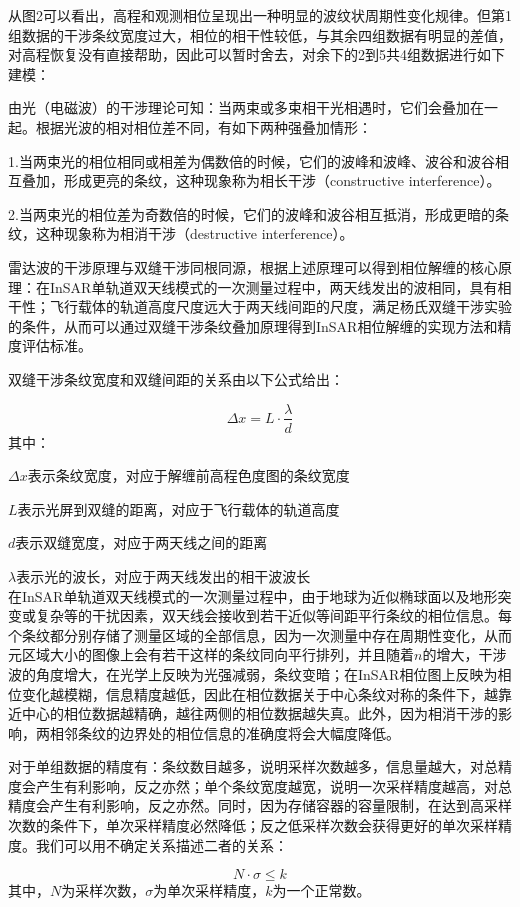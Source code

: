 \documentclass[a4paper]{article}
\begin{document}
	从图2可以看出，高程和观测相位呈现出一种明显的波纹状周期性变化规律。但第1组数据的干涉条纹宽度过大，相位的相干性较低，与其余四组数据有明显的差值，对高程恢复没有直接帮助，因此可以暂时舍去，对余下的2到5共4组数据进行如下建模：\par
	由光（电磁波）的干涉理论可知：当两束或多束相干光相遇时，它们会叠加在一起。根据光波的相对相位差不同，有如下两种强叠加情形：\par
	1.当两束光的相位相同或相差为偶数倍的时候，它们的波峰和波峰、波谷和波谷相互叠加，形成更亮的条纹，这种现象称为相长干涉（constructive interference）。\par
	2.当两束光的相位差为奇数倍的时候，它们的波峰和波谷相互抵消，形成更暗的条纹，这种现象称为相消干涉（destructive interference）。\par
	雷达波的干涉原理与双缝干涉同根同源，根据上述原理可以得到相位解缠的核心原理：在InSAR单轨道双天线模式的一次测量过程中，两天线发出的波相同，具有相干性；飞行载体的轨道高度尺度远大于两天线间距的尺度，满足杨氏双缝干涉实验的条件，从而可以通过双缝干涉条纹叠加原理得到InSAR相位解缠的实现方法和精度评估标准。\par

	双缝干涉条纹宽度和双缝间距的关系由以下公式给出：\par
	\begin{equation}
		\Delta x = L \cdot \frac{\lambda}{d}
	\end{equation}
	其中：\par
	$ \Delta x $表示条纹宽度，对应于解缠前高程色度图的条纹宽度\par
	$ L $表示光屏到双缝的距离，对应于飞行载体的轨道高度\par
	$ d $表示双缝宽度，对应于两天线之间的距离\par
	$ \lambda $表示光的波长，对应于两天线发出的相干波波长\\

	在InSAR单轨道双天线模式的一次测量过程中，由于地球为近似椭球面以及地形突变或复杂等的干扰因素，双天线会接收到若干近似等间距平行条纹的相位信息。每个条纹都分别存储了测量区域的全部信息，因为一次测量中存在周期性变化，从而元区域大小的图像上会有若干这样的条纹同向平行排列，并且随着$ n $的增大，干涉波的角度增大，在光学上反映为光强减弱，条纹变暗；在InSAR相位图上反映为相位变化越模糊，信息精度越低，因此在相位数据关于中心条纹对称的条件下，越靠近中心的相位数据越精确，越往两侧的相位数据越失真。此外，因为相消干涉的影响，两相邻条纹的边界处的相位信息的准确度将会大幅度降低。\par
	对于单组数据的精度有：条纹数目越多，说明采样次数越多，信息量越大，对总精度会产生有利影响，反之亦然；单个条纹宽度越宽，说明一次采样精度越高，对总精度会产生有利影响，反之亦然。同时，因为存储容器的容量限制，在达到高采样次数的条件下，单次采样精度必然降低；反之低采样次数会获得更好的单次采样精度。我们可以用不确定关系描述二者的关系：\par
	\begin{equation}
		N \cdot \sigma \leq k
	\end{equation}	
	其中，$ N $为采样次数，$ \sigma $为单次采样精度，$ k $为一个正常数。
	
\end{document}
